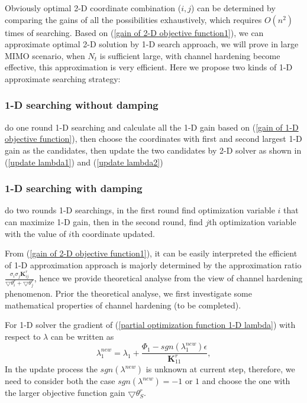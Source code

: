 \documentclass[12pt, draftclsnofoot, onecolumn]{IEEEtran}
\begin{document}
\begin{spacing}{2}
Obviously optimal 2-D coordinate combination ($i, j$) can be determined by comparing the gains of all the possibilities exhaustively, which requires $O(n^{2})$ times of searching. Based on (\ref{gain of 2-D objective function1}), we can approximate optimal 2-D solution by 1-D search approach, we will prove in large MIMO scenario, when $N_{t}$ is sufficient large, with channel hardening become effective, this approximation is very efficient. Here we propose two kinds of 1-D approximate searching strategy:
\subsubsection{ 1-D searching without damping}
do one round 1-D searching and calculate all the 1-D gain based on (\ref{gain of 1-D objective function}), then choose the coordinates with first and second largest 1-D gain as the candidates, then update the two candidates by 2-D solver as shown in (\ref{update lambda1}) and (\ref{update lambda2})
\subsubsection{ 1-D searching with damping}
do two rounds 1-D searchings, in the first round find optimization variable $i$ that can maximize 1-D gain, then in the second round, find $j$th optimization variable with the value of $i$th coordinate updated.

From (\ref{gain of 2-D objective function1}), it can be easily interpreted the efficient of 1-D approximation approach is majorly determined by the approximation ratio $\frac{\sigma_{i}\sigma_{j}\mathbf{K}^{r}_{ij}}{\bigtriangledown \theta^{r}_{i}+\bigtriangledown \theta^{r}_{j}}$, hence we provide theoretical analyse from the view of channel hardening phenomenon. Prior the theoretical analyse, we first investigate some mathematical properties of channel hardening (to be completed).    

For 1-D solver the gradient of (\ref{partial optimization function 1-D lambda}) with respect to $\lambda$ can be written as
\begin{equation}
\lambda_{1}^{new}=\lambda_{1}+\frac{\Phi_{1}-sgn(\lambda_{1}^{new})\epsilon}{\mathbf{K}^{r}_{11}},
\label{gradient lambda}
\end{equation}
In the update process the $sgn(\lambda^{new})$ is unknown at current step, therefore, we need to consider both the case $sgn(\lambda^{new})=-1 $ or $1$ and choose the one with the larger objective function gain $\bigtriangledown \theta^{r}_{S}$.
 




\end{spacing}
\end{document}
